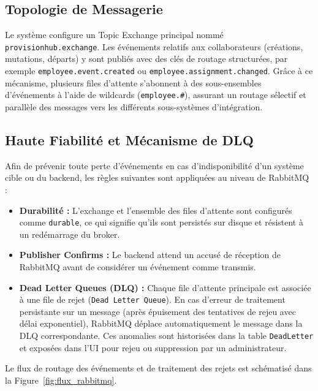 \subsection{Topologie de Messagerie}
Le système configure un Topic Exchange principal nommé \texttt{provisionhub.exchange}. Les événements relatifs aux collaborateurs (créations, mutations, départs) y sont publiés avec des clés de routage structurées, par exemple \texttt{employee.event.created} ou \texttt{employee.assignment.changed}. 
Grâce à ce mécanisme, plusieurs files d'attente s'abonnent à des sous-ensembles d'événements à l'aide de wildcards (\texttt{employee.\#}), assurant un routage sélectif et parallèle des messages vers les différents sous-systèmes d'intégration.

\subsection{Haute Fiabilité et Mécanisme de DLQ}
Afin de prévenir toute perte d'événements en cas d'indisponibilité d'un système cible ou du backend, les règles suivantes sont appliquées au niveau de RabbitMQ :
\begin{itemize}
    \item \textbf{Durabilité :} L'exchange et l'ensemble des files d'attente sont configurés comme \texttt{durable}, ce qui signifie qu'ils sont persistés sur disque et résistent à un redémarrage du broker.
    \item \textbf{Publisher Confirms :} Le backend attend un accusé de réception de RabbitMQ avant de considérer un événement comme transmis.
    \item \textbf{Dead Letter Queues (DLQ) :} Chaque file d'attente principale est associée à une file de rejet (\texttt{Dead Letter Queue}). En cas d'erreur de traitement persistante sur un message (après épuisement des tentatives de rejeu avec délai exponentiel), RabbitMQ déplace automatiquement le message dans la DLQ correspondante. Ces anomalies sont historisées dans la table \texttt{DeadLetter} et exposées dans l'UI pour rejeu ou suppression par un administrateur.
\end{itemize}

Le flux de routage des événements et de traitement des rejets est schématisé dans la Figure~\ref{fig:flux_rabbitmq}.

